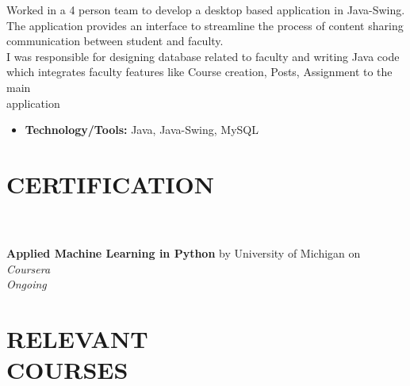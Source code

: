 \documentclass[margin]{res}
\begin{document}
\begin{resume}
Worked in a 4 person team to develop a desktop based application in Java-Swing. The application provides an interface to streamline the process of content sharing communication between student and faculty.\\
I was responsible for designing database related to faculty and writing Java code which integrates faculty features like Course creation, Posts, Assignment to the main \\application
\begin{itemize}
\item \textbf{Technology/Tools:} Java, Java-Swing, MySQL 
\end{itemize}



\section{CERTIFICATION}
\par
{}
\\
\\
\textbullet{} \textbf{Applied Machine Learning in Python} by University of Michigan on \sl{Coursera} \\ Ongoing


\section{RELEVANT\\COURSES}
\par



\end{resume}
\end{document}
